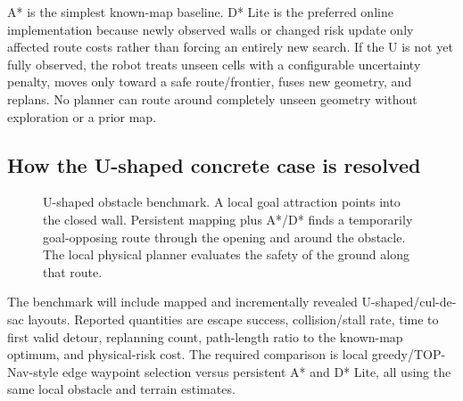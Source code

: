 A* is the simplest known-map baseline. D* Lite is the preferred online implementation because newly observed walls or changed risk update only affected route costs rather than forcing an entirely new search. If the U is not yet fully observed, the robot treats unseen cells with a configurable uncertainty penalty, moves only toward a safe route/frontier, fuses new geometry, and replans. No planner can route around completely unseen geometry without exploration or a prior map.

\subsection{How the U-shaped concrete case is resolved}

\begin{figure}[ht]
\centering
{}
\caption{U-shaped obstacle benchmark. A local goal attraction points into the closed wall. Persistent mapping plus A*/D* finds a temporarily goal-opposing route through the opening and around the obstacle. The local physical planner evaluates the safety of the ground along that route.}
\label{fig:u_shape}
\end{figure}

The benchmark will include mapped and incrementally revealed U-shaped/cul-de-sac layouts. Reported quantities are escape success, collision/stall rate, time to first valid detour, replanning count, path-length ratio to the known-map optimum, and physical-risk cost. The required comparison is local greedy/TOP-Nav-style edge waypoint selection versus persistent A* and D* Lite, all using the same local obstacle and terrain estimates.

